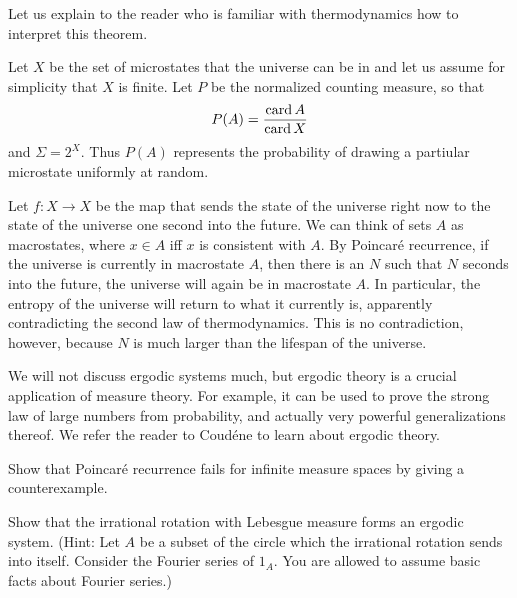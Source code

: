 \begin{subsec}
Let us explain to the reader who is familiar with thermodynamics how to interpret this theorem.

Let $X$ be the set of microstates that the universe can be in and let us assume for simplicity that $X$ is finite.
Let $P$ be the normalized counting measure, so that
$$P(A) = \frac{\operatorname{card} A}{\operatorname{card} X}$$
and $\Sigma = 2^X$.
Thus $P(A)$ represents the probability of drawing a partiular microstate uniformly at random.

Let $f: X \to X$ be the map that sends the state of the universe right now to the state of the universe one second into the future.
We can think of sets $A$ as macrostates, where $x \in A$ iff $x$ is consistent with $A$.
By Poincar\'e recurrence, if the universe is currently in macrostate $A$, then there is an $N$ such that $N$ seconds into the future, the universe will again be in macrostate $A$.
In particular, the entropy of the universe will return to what it currently is, apparently contradicting the second law of thermodynamics.
This is no contradiction, however, because $N$ is much larger than the lifespan of the universe.
\end{subsec}

\begin{subsec}
We will not discuss ergodic systems much, but ergodic theory is a crucial application of measure theory.
For example, it can be used to prove the strong law of large numbers from probability, and actually very powerful generalizations thereof.
We refer the reader to Coud\'ene \cite{coudène2016ergodic} to learn about ergodic theory.
\end{subsec}

\begin{exercise}
Show that Poincar\'e recurrence fails for infinite measure spaces by giving a counterexample.
\end{exercise}

\begin{exercise}
\label{irrational rotation exercise}
Show that the irrational rotation with Lebesgue measure forms an ergodic system.
(Hint: Let $A$ be a subset of the circle which the irrational rotation sends into itself. Consider the Fourier series of $1_A$. You are allowed to assume basic facts about Fourier series.)
\end{exercise}
